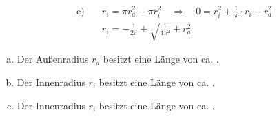 \begin{exercise}
\begin{minipage}{\dimen2}
\begin{equation*}
\begin{split}
            \\[2ex]
            \text{c)}&\quad
            r_i=\pi r_a^2-\pi r_i^2
            \quad\Rightarrow\quad
            0=r_i^2+\frac{1}{\pi}\cdot r_i-r_a^2
            \\
            \text{~}&\quad
            r_i=-\frac{1}{2\pi}+\sqrt{\frac{1}{4\pi^2}+r_a^2}
          \end{split}
        \end{equation*}
      \end{minipage}%
    \endgroup
  \fi
  \ifoutcome\outcome
    \begin{enumerate}[a)]
      \item Der Außenradius $r_a$ besitzt eine Länge von ca. .
      \item Der Innenradius $r_i$ besitzt eine Länge von ca. .
      \item Der Innenradius $r_i$ besitzt eine Länge von ca. .
    \end{enumerate}
  \fi
\end{exercise}
